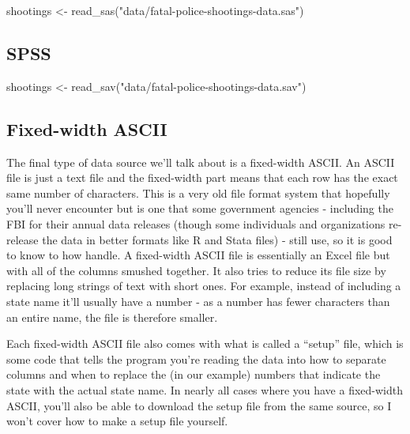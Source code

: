 \documentclass[
  a4paper,
]{krantz}
\makeatletter
\newenvironment{Shaded}{\begin{snugshade}}{\end{snugshade}}
\newcommand{\FunctionTok}[1]{\textcolor[rgb]{0.00,0.00,0.00}{#1}}
\newcommand{\NormalTok}[1]{#1}
\newcommand{\OtherTok}[1]{\textcolor[rgb]{0.56,0.35,0.01}{#1}}
\newcommand{\StringTok}[1]{\textcolor[rgb]{0.31,0.60,0.02}{#1}}
\newenvironment{kframe}{%
\medskip{}
\setlength{\fboxsep}{.8em}
 \def\at@end@of@kframe{}%
 \ifinner\ifhmode%
  \def\at@end@of@kframe{\end{minipage}}%
  \begin{minipage}{\columnwidth}%
 \fi\fi%
 \def\FrameCommand##1{\hskip\@totalleftmargin \hskip-\fboxsep
 \colorbox{shadecolor}{##1}\hskip-\fboxsep
     \hskip-\linewidth \hskip-\@totalleftmargin \hskip\columnwidth}%
 \MakeFramed {\advance\hsize-\width
   \@totalleftmargin\z@ \linewidth\hsize
   \@setminipage}}%
 {\par\unskip\endMakeFramed%
 \at@end@of@kframe}
\renewenvironment{Shaded}{\begin{kframe}}{\end{kframe}}
\makeatother
\begin{document}
\begin{Shaded}
\begin{Highlighting}[]
\NormalTok{shootings }\OtherTok{\textless{}{-}} \FunctionTok{read\_sas}\NormalTok{(}\StringTok{"data/fatal{-}police{-}shootings{-}data.sas"}\NormalTok{)}
\end{Highlighting}
\end{Shaded}

\hypertarget{spss}{%
\subsection{SPSS}\label{spss}}

\begin{Shaded}
\begin{Highlighting}[]
\NormalTok{shootings }\OtherTok{\textless{}{-}} \FunctionTok{read\_sav}\NormalTok{(}\StringTok{"data/fatal{-}police{-}shootings{-}data.sav"}\NormalTok{)}
\end{Highlighting}
\end{Shaded}

\hypertarget{fixed-width-ascii}{%
\subsection{Fixed-width ASCII}\label{fixed-width-ascii}}

The final type of data source we'll talk about is a
fixed-width ASCII. An ASCII file is just a text file and the
fixed-width part means that each row has the exact same
number of characters. This is a very old file format system
that hopefully you'll never encounter but is one that some
government agencies - including the FBI for their annual
data releases (though some individuals and organizations
re-release the data in better formats like R and Stata
files) - still use, so it is good to know to how handle. A
fixed-width ASCII file is essentially an Excel file but with
all of the columns smushed together. It also tries to reduce
its file size by replacing long strings of text with short
ones. For example, instead of including a state name it'll
usually have a number - as a number has fewer characters
than an entire name, the file is therefore smaller.

Each fixed-width ASCII file also comes with what is called a
``setup'' file, which is some code that tells the program
you're reading the data into how to separate columns and
when to replace the (in our example) numbers that indicate
the state with the actual state name. In nearly all cases
where you have a fixed-width ASCII, you'll also be able to
download the setup file from the same source, so I won't
cover how to make a setup file yourself.
\end{document}
